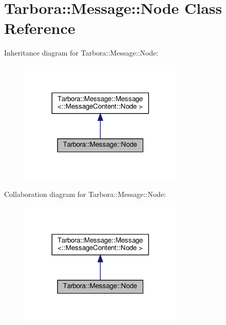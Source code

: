 \hypertarget{classTarbora_1_1Message_1_1Node}{}\section{Tarbora\+:\+:Message\+:\+:Node Class Reference}
\label{classTarbora_1_1Message_1_1Node}


Inheritance diagram for Tarbora\+:\+:Message\+:\+:Node\+:
\nopagebreak
\begin{figure}[H]
\begin{center}
\leavevmode
\includegraphics[width=221pt]{classTarbora_1_1Message_1_1Node__inherit__graph}
\end{center}
\end{figure}


Collaboration diagram for Tarbora\+:\+:Message\+:\+:Node\+:
\nopagebreak
\begin{figure}[H]
\begin{center}
\leavevmode
\includegraphics[width=221pt]{classTarbora_1_1Message_1_1Node__coll__graph}
\end{center}
\end{figure}

